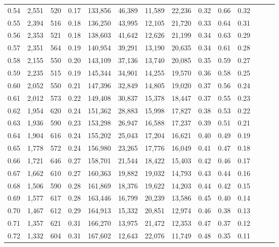 \begin{tabular}{rrrrrrrrrrrrrr}
0.54 &  2,551 &  520 &  0.17 &  133,856 &   46,389 &  11,589 &  22,236 &  0.32 &  0.66 &      0.32 \\
0.55 &  2,394 &  516 &  0.18 &  136,250 &   43,995 &  12,105 &  21,720 &  0.33 &  0.64 &      0.31 \\
0.56 &  2,353 &  521 &  0.18 &  138,603 &   41,642 &  12,626 &  21,199 &  0.34 &  0.63 &      0.29 \\
0.57 &  2,351 &  564 &  0.19 &  140,954 &   39,291 &  13,190 &  20,635 &  0.34 &  0.61 &      0.28 \\
0.58 &  2,155 &  550 &  0.20 &  143,109 &   37,136 &  13,740 &  20,085 &  0.35 &  0.59 &      0.27 \\
0.59 &  2,235 &  515 &  0.19 &  145,344 &   34,901 &  14,255 &  19,570 &  0.36 &  0.58 &      0.25 \\
0.60 &  2,052 &  550 &  0.21 &  147,396 &   32,849 &  14,805 &  19,020 &  0.37 &  0.56 &      0.24 \\
0.61 &  2,012 &  573 &  0.22 &  149,408 &   30,837 &  15,378 &  18,447 &  0.37 &  0.55 &      0.23 \\
0.62 &  1,954 &  620 &  0.24 &  151,362 &   28,883 &  15,998 &  17,827 &  0.38 &  0.53 &      0.22 \\
0.63 &  1,936 &  590 &  0.23 &  153,298 &   26,947 &  16,588 &  17,237 &  0.39 &  0.51 &      0.21 \\
0.64 &  1,904 &  616 &  0.24 &  155,202 &   25,043 &  17,204 &  16,621 &  0.40 &  0.49 &      0.19 \\
0.65 &  1,778 &  572 &  0.24 &  156,980 &   23,265 &  17,776 &  16,049 &  0.41 &  0.47 &      0.18 \\
0.66 &  1,721 &  646 &  0.27 &  158,701 &   21,544 &  18,422 &  15,403 &  0.42 &  0.46 &      0.17 \\
0.67 &  1,662 &  610 &  0.27 &  160,363 &   19,882 &  19,032 &  14,793 &  0.43 &  0.44 &      0.16 \\
0.68 &  1,506 &  590 &  0.28 &  161,869 &   18,376 &  19,622 &  14,203 &  0.44 &  0.42 &      0.15 \\
0.69 &  1,577 &  617 &  0.28 &  163,446 &   16,799 &  20,239 &  13,586 &  0.45 &  0.40 &      0.14 \\
0.70 &  1,467 &  612 &  0.29 &  164,913 &   15,332 &  20,851 &  12,974 &  0.46 &  0.38 &      0.13 \\
0.71 &  1,357 &  621 &  0.31 &  166,270 &   13,975 &  21,472 &  12,353 &  0.47 &  0.37 &      0.12 \\
0.72 &  1,332 &  604 &  0.31 &  167,602 &   12,643 &  22,076 &  11,749 &  0.48 &  0.35 &      0.11 \\

\end{tabular}
